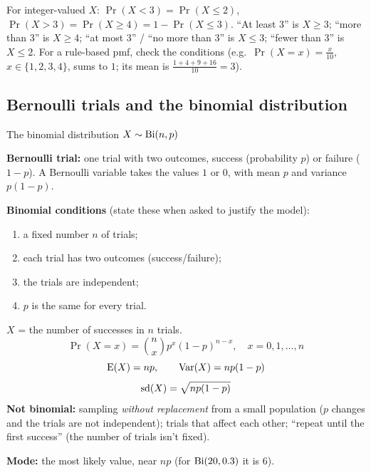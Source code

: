 \begin{tip}
For integer-valued $X$: $\Pr(X<3)=\Pr(X\le2)$, \ $\Pr(X>3)=\Pr(X\ge4)=1-\Pr(X\le3)$. ``At least 3'' is $X\ge3$; ``more than 3'' is $X\ge4$; ``at most 3'' / ``no more than 3'' is $X\le3$; ``fewer than 3'' is $X\le2$. For a rule-based pmf, check the conditions (e.g.\ $\Pr(X=x)=\frac{x}{10}$, $x\in\{1,2,3,4\}$, sums to $1$; its mean is $\frac{1+4+9+16}{10}=3$).
\end{tip}

\subsection{Bernoulli trials and the binomial distribution}
\label{sec:binomial}

\begin{keyres}{The binomial distribution $X\sim\mathrm{Bi}(n,p)$}
\begin{cols}
\textbf{Bernoulli trial:} one trial with two outcomes, success (probability $p$) or failure ($1-p$). A Bernoulli variable takes the values $1$ or $0$, with mean $p$ and variance $p(1-p)$.\par
\textbf{Binomial conditions} (state these when asked to justify the model):
\begin{enumerate}
  \item a fixed number $n$ of trials;
  \item each trial has two outcomes (success/failure);
  \item the trials are independent;
  \item $p$ is the same for every trial.
\end{enumerate}
$X$ = the number of successes in $n$ trials.
\nextcol
\[\Pr(X=x)=\binom{n}{x}p^x(1-p)^{n-x},\quad x=0,1,\dots,n\]
\[\mathrm{E}(X)=np,\qquad\mathrm{Var}(X)=np(1-p)\]
\[\mathrm{sd}(X)=\sqrt{np(1-p)}\]
\textbf{Not binomial:} sampling \emph{without replacement} from a small population ($p$ changes and the trials are not independent); trials that affect each other; ``repeat until the first success'' (the number of trials isn't fixed).\par
\textbf{Mode:} the most likely value, near $np$ (for $\mathrm{Bi}(20,0.3)$ it is $6$).
\end{cols}
\end{keyres}

